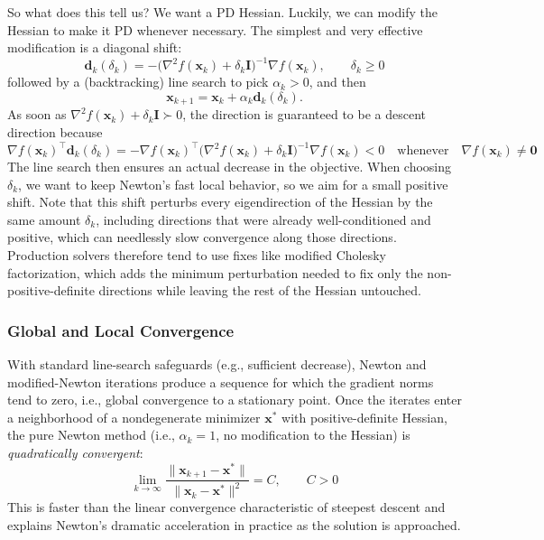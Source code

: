 So what does this tell us? We want a PD Hessian. Luckily, we can modify the Hessian to make it PD whenever necessary. The simplest and very effective modification is a diagonal shift:
\begin{equation}
\mathbf{d}_k(\delta_k)
=
-\big(\nabla^2 f(\mathbf{x}_k)+\delta_k \mathbf{I}\big)^{-1}\nabla f(\mathbf{x}_k),
\qquad \delta_k\ge 0
\end{equation}
followed by a (backtracking) line search to pick $\alpha_k>0$, and then
\begin{equation}
\mathbf{x}_{k+1}=\mathbf{x}_k+\alpha_k\mathbf{d}_k(\delta_k).
\end{equation}
As soon as $\nabla^2 f(\mathbf{x}_k)+\delta_k\mathbf{I}\succ 0$, the direction is guaranteed to be a descent direction because
\begin{equation}
\nabla f(\mathbf{x}_k)^\top \mathbf{d}_k(\delta_k)
=
-\nabla f(\mathbf{x}_k)^\top
\big(\nabla^2 f(\mathbf{x}_k)+\delta_k \mathbf{I}\big)^{-1}
\nabla f(\mathbf{x}_k)
<0
\quad\text{whenever}\quad \nabla f(\mathbf{x}_k)\ne \mathbf{0}
\end{equation}
The line search then ensures an actual decrease in the objective. When choosing $\delta_k$, we want to keep Newton's fast local behavior, so we aim for a small positive shift. Note that this shift perturbs every eigendirection of the Hessian by the same amount $\delta_k$, including directions that were already well-conditioned and positive, which can needlessly slow convergence along those directions. Production solvers therefore tend to use fixes like modified Cholesky factorization, which adds the minimum perturbation needed to fix only the non-positive-definite directions while leaving the rest of the Hessian untouched.

\subsubsection{Global and Local Convergence}
With standard line-search safeguards (e.g., sufficient decrease), Newton and modified-Newton iterations produce a sequence for which the gradient norms tend to zero, i.e., global convergence to a stationary point. Once the iterates enter a neighborhood of a nondegenerate minimizer $\mathbf{x}^\ast$ with positive-definite Hessian, the pure Newton method (i.e., $\alpha_k=1$, no modification to the Hessian) is \emph{quadratically convergent}:
\begin{equation}
\lim_{k\to\infty}\frac{\|\mathbf{x}_{k+1}-\mathbf{x}^\ast\|}{\|\mathbf{x}_k-\mathbf{x}^\ast\|^2}=C,\qquad C>0
\label{eq:newton_quadratic_convergence}
\end{equation}
This is faster than the linear convergence characteristic of steepest descent and explains Newton's dramatic acceleration in practice as the solution is approached.  


